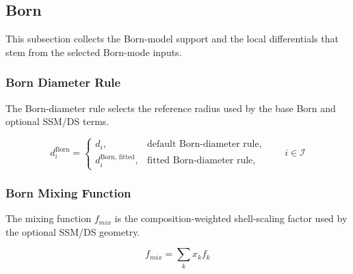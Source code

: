 \documentclass[12pt, letterpaper]{article}
\begin{document}
\subsection{Born}
\label{sec:born}

This subsection collects the Born-model support and the local differentials that stem from the selected Born-mode inputs.

\subsubsection{Born Diameter Rule}

The Born-diameter rule selects the reference radius used by the base Born and optional SSM/DS terms.

\begin{equation}
    d^{\text{Born}}_{i}
    =
    \begin{cases}
        d_{i}, & \text{default Born-diameter rule}, \\
        d^{\text{Born, fitted}}_{i}, & \text{fitted Born-diameter rule},
    \end{cases}
    \qquad i\in\mathcal{I}
    \label{eq:d_born_rule}
\end{equation}

\subsubsection{Born Mixing Function}

The mixing function \(f_{mix}\) is the composition-weighted shell-scaling factor used by the optional SSM/DS geometry.

\begin{equation}
    f_{mix}=\sum_{k}x_{k}f_{k}
    \label{eq:f_mix}
\end{equation}
\end{document}
